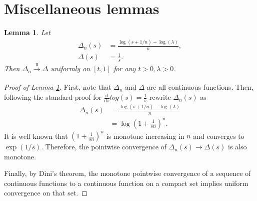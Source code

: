 \documentclass[a4paper]{article}
\newtheorem{lemma}{Lemma}
\begin{document}
\appendix

\printbibliography

\section{Miscellaneous lemmas}

\begin{lemma}
    \label{lemma:log_convergence}
    Let 
    \begin{align*}
        \Delta_n(s) &= \frac{\log(s + 1/n) - \log(\lambda)}{n}, \\
        \Delta(s) &= \frac{1}{s}.
    \end{align*}
    Then $\Delta_n \xrightarrow[]{\mathrm{u}} \Delta$ uniformly on $[t, 1]$ for any $t > 0, \lambda > 0$.
\end{lemma}
\begin{proof}[Proof of Lemma \ref{lemma:log_convergence}]
    First, note that $\Delta_n$ and $\Delta$ are all continuous functions. Then, following the standard proof for $\frac{\mathrm{d}}{\mathrm{d}s}log(s) = \frac{1}{s}$ rewrite $\Delta_n(s)$ as
    \begin{align*}
        \Delta_n(s) &= \frac{\log(s + 1/n) - \log(\lambda)}{n} \\
        &= \log \left( 1 + \frac{1}{sn} \right) ^ n .
    \end{align*}
    It is well known that $\left( 1 + \frac{1}{sn} \right) ^ n$ is monotone increasing in $n$ and converges to $\exp (1/s)$. Therefore, the pointwise convergence of $\Delta_n(s) \to \Delta(s)$ is also monotone.

    Finally, by Dini's theorem, the monotone pointwise convergence of a sequence of continuous functions to a continuous function on a compact set implies uniform convergence on that set.
\end{proof}
\end{document}
